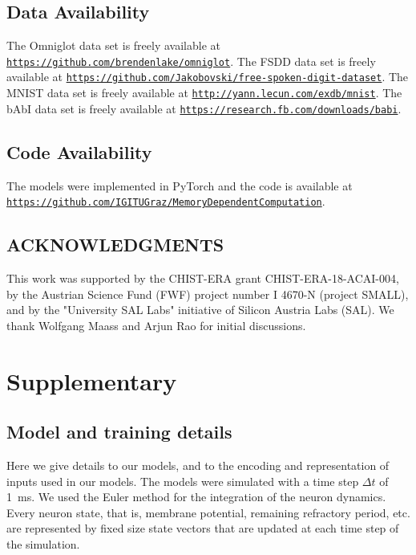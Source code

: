 \documentclass{article}
\begin{document}
\subsection*{Data Availability}
The Omniglot data set \cite{lake2015human} is freely available at \href{https://github.com/brendenlake/omniglot}{\nolinkurl{https://github.com/brendenlake/omniglot}}. The FSDD data set \cite{fsd2016} is freely available at \href{https://github.com/Jakobovski/free-spoken-digit-dataset}{\nolinkurl{https://github.com/Jakobovski/free-spoken-digit-dataset}}. The MNIST data set \cite{lecun2010mnist} is freely available at \href{http://yann.lecun.com/exdb/mnist}{\nolinkurl{http://yann.lecun.com/exdb/mnist}}. The bAbI data set \cite{weston2015towards} is freely available at \href{https://research.fb.com/downloads/babi}{\nolinkurl{https://research.fb.com/downloads/babi}}.

\subsection*{Code Availability}
The models were implemented in PyTorch \cite{paszke2019pytorch} and the code is available at \href{https://github.com/IGITUGraz/MemoryDependentComputation}{\nolinkurl{https://github.com/IGITUGraz/MemoryDependentComputation}}.

\subsection*{ACKNOWLEDGMENTS}
This work was supported by the CHIST-ERA grant CHIST-ERA-18-ACAI-004, by the Austrian Science Fund (FWF) project number I 4670-N (project SMALL), and by the "University SAL Labs" initiative of Silicon Austria Labs (SAL). We thank Wolfgang Maass and Arjun Rao for initial discussions.



\printbibliography


\clearpage
\appendix
\setcounter{equation}{0}
\setcounter{figure}{0}
\setcounter{table}{0}
\renewcommand{\thefigure}{S\arabic{figure}}
\renewcommand{\thetable}{S\arabic{table}}

\section*{Supplementary}

\subsection*{Model and training details}
Here we give details to our models, and to the encoding and representation of inputs used in our models. The models were simulated with a time step $\Delta t$ of \SI{1}{ms}. We used the Euler method for the integration of the neuron dynamics. Every neuron state, that is, membrane potential, remaining refractory period, etc. are represented by fixed size state vectors that are updated at each time step of the simulation.
\end{document}
